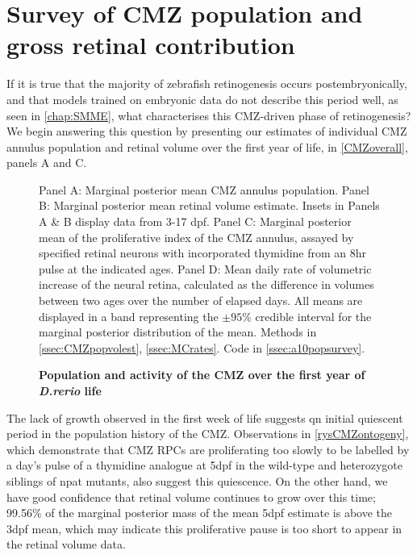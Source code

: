 \section{Survey of CMZ population and gross retinal contribution}

If it is true that the majority of zebrafish retinogenesis occurs postembryonically, and that models trained on embryonic data do not describe this period well, as seen in \autoref{chap:SMME}, what characterises this CMZ-driven phase of retinogenesis? We begin answering this question by presenting our estimates of individual CMZ annulus population and retinal volume over the first year of life, in \autoref{CMZoverall}, panels A and C.

\begin{figure}[!h]
    \caption{{\bf Population and activity of the CMZ over the first year of \textit{D.rerio} life}}
    Panel A: Marginal posterior mean CMZ annulus population. Panel B: Marginal posterior mean retinal volume estimate. Insets in Panels A \& B display data from 3-17 dpf. Panel C: Marginal posterior mean of the proliferative index of the CMZ annulus, assayed by specified retinal neurons with incorporated thymidine from an 8hr pulse at the indicated ages. Panel D: Mean daily rate of volumetric increase of the neural retina, calculated as the difference in volumes between two ages over the number of elapsed days. All means are displayed in a band representing the $\pm 95 \%$ credible interval for the marginal posterior distribution of the mean.
    \label{CMZoverall}
    Methods in \autoref{ssec:CMZpopvolest}, \autoref{ssec:MCrates}.
    Code in \autoref{ssec:a10popsurvey}.
\end{figure}

The lack of growth observed in the first week of life suggests qn initial quiescent period in the population history of the CMZ. Observations in \autoref{rysCMZontogeny}, which demonstrate that CMZ RPCs are proliferating too slowly to be labelled by a day's pulse of a thymidine analogue at 5dpf in the wild-type and heterozygote siblings of npat mutants, also suggest this quiescence. On the other hand, we have good confidence that retinal volume continues to grow over this time; 99.56\% of the marginal posterior mass of the mean 5dpf estimate is above the 3dpf mean, which may indicate this proliferative pause is too short to appear in the retinal volume data.

